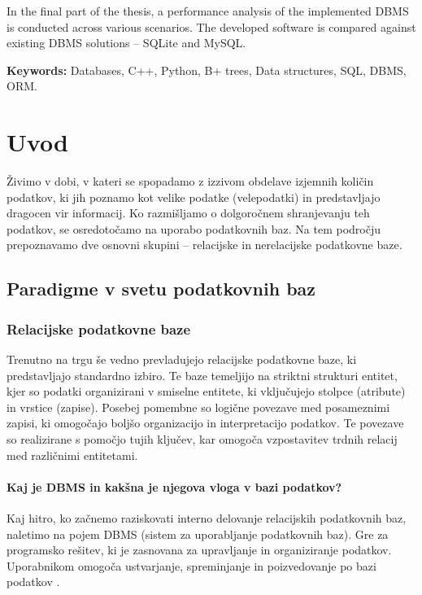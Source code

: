 \documentclass[a4paper,12pt,openright]{book}
\newcommand{\tkeywordsEn}{Databases, C++, Python, B+ trees, Data structures, SQL, DBMS, ORM}
\newcommand{\clearemptydoublepage}{\newpage{\pagestyle{empty}\cleardoublepage}}
\begin{document}
In the final part of the thesis, a performance analysis of the implemented DBMS is conducted across various scenarios. The developed software is compared against existing DBMS solutions – SQLite and MySQL.
\bigskip

\noindent\textbf{Keywords:} \tkeywordsEn.
\clearemptydoublepage

\mainmatter
\setcounter{page}{1}
\pagestyle{fancy}

\chapter{Uvod}
    Živimo v dobi, v kateri se spopadamo z izzivom obdelave izjemnih količin podatkov, ki jih poznamo kot velike podatke (velepodatki) in predstavljajo dragocen vir informacij. Ko razmišljamo o dolgoročnem shranjevanju teh podatkov, se osredotočamo na uporabo podatkovnih baz. Na tem področju prepoznavamo dve osnovni skupini – relacijske in nerelacijske podatkovne baze.
    \section{Paradigme v svetu podatkovnih baz}
        \subsection{Relacijske podatkovne baze}
        Trenutno na trgu še vedno prevladujejo relacijske podatkovne baze, ki predstavljajo standardno izbiro. Te baze temeljijo na striktni strukturi entitet, kjer so podatki organizirani v smiselne entitete, ki vključujejo stolpce (atribute) in vrstice (zapise). Posebej pomembne so logične povezave med posameznimi zapisi, ki omogočajo boljšo organizacijo in interpretacijo podatkov. Te povezave so realizirane s pomočjo tujih ključev, kar omogoča vzpostavitev trdnih relacij med različnimi entitetami.

        \subsubsection{Kaj je DBMS in kakšna je njegova vloga v bazi podatkov?}

        Kaj hitro, ko začnemo raziskovati interno delovanje relacijskih podatkovnih baz, naletimo na pojem DBMS (sistem za uporabljanje podatkovnih baz). Gre za programsko rešitev, ki je zasnovana za upravljanje in organiziranje podatkov. Uporabnikom omogoča ustvarjanje, spreminjanje in poizvedovanje po bazi podatkov \cite{DBMS_G4G}.
\end{document}
